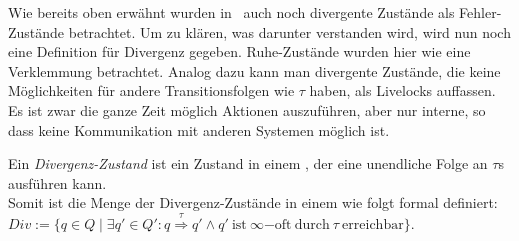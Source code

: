 


Wie bereits oben erwähnt wurden in~\cite{Chilton2013} auch noch divergente
Zustände als Fehler-Zustände betrachtet. Um zu klären, was darunter verstanden
wird, wird nun noch eine Definition für Divergenz gegeben. Ruhe-Zustände wurden
hier wie eine Verklemmung betrachtet. Analog dazu kann man divergente Zustände,
die keine Möglichkeiten für andere Transitionsfolgen wie $\tau$ haben,
als Livelocks auffassen. Es ist zwar die ganze Zeit möglich Aktionen
auszuführen, aber nur interne, so dass keine Kommunikation mit anderen Systemen
möglich ist.

\begin{Def}[Divergenz]
  Ein \emph{Divergenz-Zustand} ist ein Zustand in einem \EIO{}, der eine
  unendliche Folge an $\tau$s ausführen kann.\\
  Somit ist die Menge der Divergenz-Zustände in einem \EIO{} wie folgt formal
  definiert: $Div := \{q\in Q\mid \exists q'\in Q': q
  \overset{\tau}{\Rightarrow} q' \wedge q'~\mathrm{ist}~\infty\mathrm{-oft}
  ~\mathrm{durch}~\tau ~\mathrm{erreichbar}\}$.
\end{Def}

